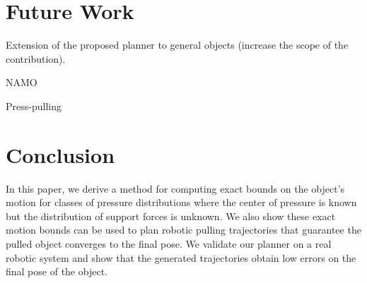\documentclass[conference]{IEEEtran}
\begin{document}
\section{Future Work}\label{sec:future work}
{
  \color{red}
  \begin{inparaenum}
  \item Extension of the proposed planner to general objects (increase the scope of the contribution).
  \item NAMO
  \item Press-pulling
  \item 
  \end{inparaenum}
}

\section{Conclusion}\label{sec:conclusion}

In this paper, we derive a method for computing exact bounds on the
object's motion for classes of pressure distributions where the center
of pressure is known but the distribution of support forces is
unknown. We also show these exact motion bounds can be used to plan
robotic pulling trajectories that guarantee the pulled object
converges to the final pose. We validate our planner on a real robotic
system and show that the generated trajectories obtain low errors on
the final pose of the object.



\end{document}

